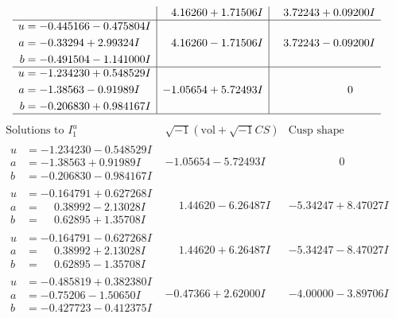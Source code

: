 \documentclass[1p]{elsarticle_modified}
\theoremstyle{definition}
\newcommand{\I}{\sqrt{-1}}
\begin{document}
$$\begin{array}{c|c|c}
 & \phantom{-}4.16260 + 1.71506 I & \phantom{-}3.72243 + 0.09200 I \\ \hline\begin{aligned}
u &= -0.445166 - 0.475804 I \\
a &= -0.33294 + 2.99324 I \\
b &= -0.491504 - 1.141000 I\end{aligned}
 & \phantom{-}4.16260 - 1.71506 I & \phantom{-}3.72243 - 0.09200 I \\ \hline\begin{aligned}
u &= -1.234230 + 0.548529 I \\
a &= -1.38563 - 0.91989 I \\
b &= -0.206830 + 0.984167 I\end{aligned}
 & -1.05654 + 5.72493 I & \phantom{-0.000000 } 0\\
 \hline 
 \end{array}$$\newpage$$\begin{array}{c|c|c}  
\text{Solutions to }I^u_{1}& \I (\text{vol} + \sqrt{-1}CS) & \text{Cusp shape}\\
 \hline 
\begin{aligned}
u &= -1.234230 - 0.548529 I \\
a &= -1.38563 + 0.91989 I \\
b &= -0.206830 - 0.984167 I\end{aligned}
 & -1.05654 - 5.72493 I & \phantom{-0.000000 } 0 \\ \hline\begin{aligned}
u &= -0.164791 + 0.627268 I \\
a &= \phantom{-}0.38992 - 2.13028 I \\
b &= \phantom{-}0.62895 + 1.35708 I\end{aligned}
 & \phantom{-}1.44620 - 6.26487 I & -5.34247 + 8.47027 I \\ \hline\begin{aligned}
u &= -0.164791 - 0.627268 I \\
a &= \phantom{-}0.38992 + 2.13028 I \\
b &= \phantom{-}0.62895 - 1.35708 I\end{aligned}
 & \phantom{-}1.44620 + 6.26487 I & -5.34247 - 8.47027 I \\ \hline\begin{aligned}
u &= -0.485819 + 0.382380 I \\
a &= -0.75206 - 1.50650 I \\
b &= -0.427723 - 0.412375 I\end{aligned}
 & -0.47366 + 2.62000 I & -4.00000 - 3.89706 I \\ \hline\begin{aligned}

\end{aligned}
\end{array}$$
\end{document}
